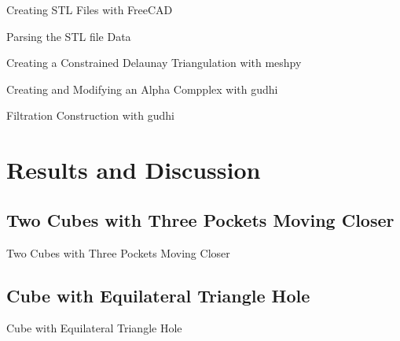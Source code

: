 \documentclass[xcolor=dvipsnames]{beamer}
\begin{document}
\begin{frame}{Creating STL Files with FreeCAD}

\end{frame}

\begin{frame}{Parsing the STL file Data}

\end{frame}

\begin{frame}{Creating a Constrained Delaunay Triangulation with meshpy}

\end{frame}

\begin{frame}{Creating and Modifying an Alpha Compplex with gudhi}

\end{frame}

\begin{frame}{Filtration Construction with gudhi}

\end{frame}

\section{Results and Discussion}
\subsection{Two Cubes with Three Pockets Moving Closer}
\begin{frame}{Two Cubes with Three Pockets Moving Closer}

\end{frame}

\subsection{Cube with Equilateral Triangle Hole}
\begin{frame}{Cube with Equilateral Triangle Hole}

\end{frame}
\end{document}
